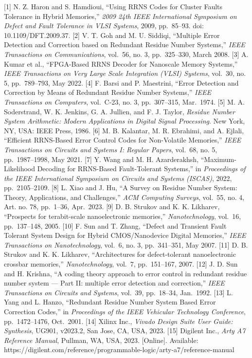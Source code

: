 \documentclass[
  12pt,
  a4paper]{report}
\begin{document}
{[}1{]} N. Z. Haron and S. Hamdioui, ``Using RRNS Codes for Cluster
Faults Tolerance in Hybrid Memories,'' \emph{2009 24th IEEE
International Symposium on Defect and Fault Tolerance in VLSI Systems},
2009, pp.~85--93. doi: 10.1109/DFT.2009.37. {[}2{]} V. T. Goh and M. U.
Siddiqi, ``Multiple Error Detection and Correction based on Redundant
Residue Number Systems,'' \emph{IEEE Transactions on Communications},
vol.~56, no. 3, pp.~325--330, March 2008. {[}3{]} A. Kumar et al.,
``FPGA-Based RRNS Decoder for Nanoscale Memory Systems,'' \emph{IEEE
Transactions on Very Large Scale Integration (VLSI) Systems}, vol.~30,
no. 5, pp.~789--793, May 2022. {[}4{]} F. Barsi and P. Maestrini,
``Error Detection and Correction by Means of Redundant Residue Number
Systems,'' \emph{IEEE Transactions on Computers}, vol.~C-23, no. 3,
pp.~307--315, Mar.~1974. {[}5{]} M. A. Soderstrand, W. K. Jenkins, G. A.
Jullien, and F. J. Taylor, \emph{Residue Number System Arithmetic:
Modern Applications in Digital Signal Processing}. New York, NY, USA:
IEEE Press, 1986. {[}6{]} M. B. Kalantar, M. R. Ebrahimi, and A. Ejlali,
``Efficient RRNS-Based Error Control Codes for Non-Volatile Memories,''
\emph{IEEE Transactions on Circuits and Systems I: Regular Papers},
vol.~68, no. 5, pp.~1987--1998, May 2021. {[}7{]} Y. Wang and M. H.
Azarderakhsh, ``Maximum-Likelihood Decoding for RRNS-Based
Fault-Tolerant Systems,'' in \emph{Proceedings of the IEEE International
Symposium on Circuits and Systems (ISCAS)}, 2022, pp.~2105--2109.
{[}8{]} L. Xiao and J. Hu, ``A Survey on Residue Number System: Theory,
Applications, and Challenges,'' \emph{ACM Computing Surveys}, vol.~55,
no. 4, Art. no. 78, pp.~1--36, Apr.~2023. {[}9{]} D. B. Strukov and K.
K. Likharev, ``Prospects for terabit-scale nanoelectronic memories,''
\emph{Nanotechnology}, vol.~16, pp.~137--148, 2005. {[}10{]} F. Sun and
T. Zhang, ``Defect and Transient Fault Tolerant System Design for Hybrid
CMOS/Nanodevice Digital Memories,'' \emph{IEEE Transactions on
Nanotechnology}, vol.~6, no. 3, pp.~341--351, May 2007. {[}11{]} D. B.
Strukov and K. K. Likharev, ``Architectures for defect-tolerant
nanoelectronic crossbar memories,'' \emph{Nanotechnology}, vol.~7,
pp.~151--167, 2007. {[}12{]} J. D. Sun and H. Krishna, ``A coding theory
approach to error control in redundant residue number system --- Part
II: multiple error detection and correction,'' \emph{IEEE Transactions
on Circuits and Systems}, vol.~39, pp.~18--34, Jan.~1992. {[}13{]} L.
Yang and L. Hanzo, ``Redundant Residue Number System Based Error
Correction Codes,'' in \emph{Proceedings of the IEEE Vehicular
Technology Conference}, pp.~1472--1476, Oct.~2001. {[}14{]} Xilinx Inc.,
\emph{Vivado Design Suite User Guide: Synthesis}, UG901, v2023.2, San
Jose, CA, USA, 2023. {[}15{]} Digilent Inc., \emph{Arty A7 Reference
Manual}, Pullman, WA, USA, 2023. {[}Online{]}. Available:
https://digilent.com/reference/programmable-logic/arty-a7/reference-manual
\end{document}

